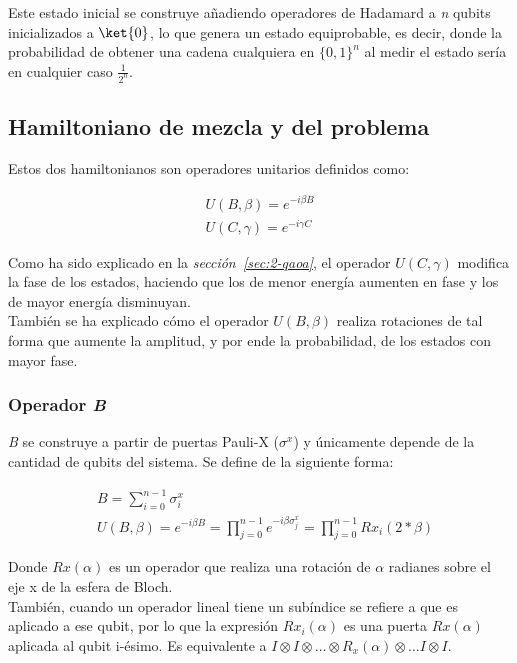 Este estado inicial se construye añadiendo operadores de Hadamard a \textit{n} qubits inicializados a $\ket{0}$, lo que genera un estado equiprobable, es decir, donde la probabilidad de obtener una cadena cualquiera en ${\{0, 1\}}^n$ al medir el estado sería en cualquier caso $\frac{1}{2^n}$.

\subsection{Hamiltoniano de mezcla y del problema\label{sec:3-problem_y_mixer_hamiltonian}}

Estos dos hamiltonianos son operadores unitarios definidos como:

\begin{align}
  U(B, \beta) = e^{-i \beta B} \\
  U(C, \gamma) = e^{-i \gamma C}
\end{align}

Como ha sido explicado en la \textit{sección~\ref{sec:2-qaoa}}, el operador $U(C, \gamma)$ modifica la fase de los estados, haciendo que los de menor energía aumenten en fase y los de mayor energía disminuyan.
\\
También se ha explicado cómo el operador $U(B, \beta)$ realiza rotaciones de tal forma que aumente la amplitud, y por ende la probabilidad, de los estados con mayor fase.

\subsubsection{Operador \textit{B}}
\textit{B} se construye a partir de puertas Pauli-X ($\sigma^x$) y únicamente depende de la cantidad de qubits del sistema.
Se define de la siguiente forma:

\begin{align}
  &B = \sum_{i=0}^{n-1}\sigma^x_{i} \\
  &U(B, \beta) = e^{-i \beta B} = \prod_{j=0}^{n-1}e^{-i \beta \sigma^x_j} = \prod_{j=0}^{n-1}Rx_i(2*\beta)
\end{align}

Donde $Rx(\alpha)$ es un operador que realiza una rotación de $\alpha$ radianes sobre el eje x de la esfera de Bloch.
\\
También, cuando un operador lineal tiene un subíndice se refiere a que es aplicado a ese qubit, por lo que la expresión $Rx_i(\alpha)$ es una puerta $Rx(\alpha)$ aplicada al qubit i-ésimo.
Es equivalente a $I \otimes I \otimes \ldots \otimes R_x(\alpha) \otimes \ldots I \otimes I$.


